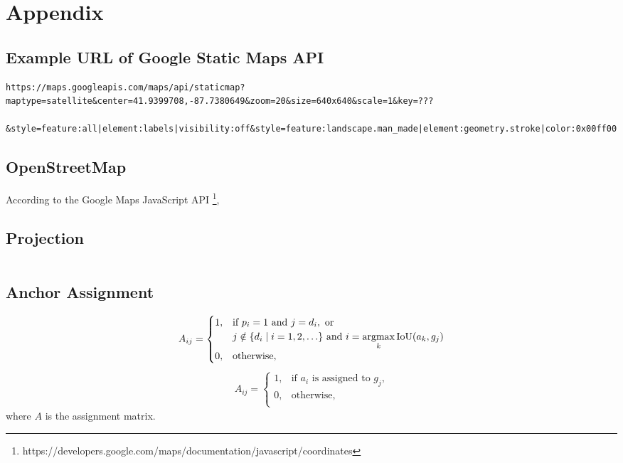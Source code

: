 \chapter{Appendix}

\section{Example URL of Google Static Maps API}\label{app:apimap}

\begin{lstlisting}
https://maps.googleapis.com/maps/api/staticmap?maptype=satellite&center=41.9399708,-87.7380649&zoom=20&size=640x640&scale=1&key=???

&style=feature:all|element:labels|visibility:off&style=feature:landscape.man_made|element:geometry.stroke|color:0x00ff00
\end{lstlisting}

\section{OpenStreetMap}\label{app:apiosm}

According to the Google Maps JavaScript API \footnote{https://developers.google.com/maps/documentation/javascript/coordinates}, 

\section{Projection}\label{app:projec}

\begin{lstlisting}
\end{lstlisting}

\section{Anchor Assignment}\label{app:assignanchor}
\begin{equation}
\begin{aligned}
	A_{ij} = \begin{cases}
		1, & \text{if } p_i = 1 \text{ and } j = d_i, \text{ or }\\
		& j \notin \{d_i \mid i = 1,2,\ldots\} \text{ and } i = \operatorname*{argmax}\limits_{k} \text{IoU}(a_k, g_j) \\
		0, & \text{otherwise},\\
	\end{cases}
\end{aligned}
\end{equation}
\begin{equation}
\begin{aligned}
	A_{ij} = \begin{cases}
		1, & \text{if $a_i$ is assigned to $g_j$,}\\
		0, & \text{otherwise},\\
	\end{cases}
\end{aligned}
\end{equation}
where $A$ is the assignment matrix. 

